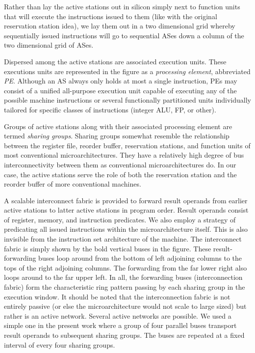 \documentclass[10pt,dvips]{article}
\begin{document}
Rather than lay the active stations out in silicon simply next to
function units that will execute the instructions issued to them
(like with the original reservation station idea),
we lay them out in a two dimensional grid whereby sequentially
issued instructions will go to sequential ASes down a column of
the two dimensional grid of ASes. 

Dispersed among the active stations are associated execution
units.  These executions units are represented in the figure as
a \textit{processing element}, abbreviated \textit{PE}.  
Although an AS always only holds at most a single instruction,
PEs may consist of a unified all-purpose execution unit capable of
executing any of the possible machine instructions or
several functionally partitioned units individually tailored
for specific classes of instructions (integer ALU, FP, or other).

Groups of active stations along with their associated processing
element
are termed \textit{sharing groups}.  Sharing groups somewhat resemble
the relationship between the register file, reorder buffer,
reservation stations, and function units of most conventional
microarchitectures.  They have a relatively high degree of bus
interconnectivity between them as conventional microarchitectures do.
In our case, the active stations serve the role of both the
reservation station and the reorder buffer of more conventional
machines.

A scalable interconnect fabric 
is provided to forward result
operands from earlier active stations to latter active stations in
program order.  Result operands consist of register, memory, and
instruction predicates.  We also employ a strategy of predicating all
issued instructions within the microarchitecture itself.  This is also 
invisible from the instruction set architecture of the machine.
The interconnect fabric is simply shown by
the bold vertical buses in the figure.  These result-forwarding buses
loop around from the bottom of left adjoining columns to the tops of
the right adjoining columns.  The forwarding from the far lower right
also loops around to the far upper left.  In all, the forwarding
buses (interconnection fabric) form the characteristic ring pattern
passing by each sharing group in the execution window.
It should be noted that the interconnection fabric is not
entirely passive (or else the microarchitecture would not
scale to large sized) but rather is an active network.
Several active networks are possible.  We used a simple one
in the present work where a group of four parallel buses transport
result operands to subsequent sharing groups.  The buses are repeated
at a fixed interval of every four sharing groups.
\end{document}
